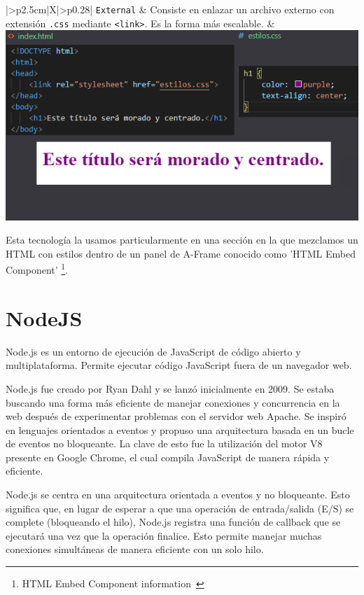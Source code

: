 \documentclass[a4paper, 12pt]{book}
\let\cleardoublepage\clearpage
\begin{document}
\begin{table}[H]
\begin{tabularx}{\linewidth}{|>{\centering\arraybackslash}p{2.5cm}|X|>{\centering\arraybackslash}p{0.28\linewidth}|}
      \texttt{External} &
      Consiste en enlazar un archivo externo con extensión \texttt{.css} mediante \texttt{<link>}. Es la forma más escalable. &
      \includegraphics[width=0.9\linewidth]{img/Style3.png} \\
      \hline
      \end{tabularx}
      \caption{Formas de aplicar CSS en un documento HTML}
      \label{tab:formas-css}
      \end{table}
  Esta tecnología la usamos particularmente en una sección en la que mezclamos un HTML con estilos dentro de un panel de A-Frame conocido como 'HTML Embed Component' \footnote{HTML Embed Component information~\cite{aframeComponent}}.

\cleardoublepage

\section{NodeJS} 
\label{sec:seccion9}

Node.js es un entorno de ejecución de JavaScript de código abierto y multiplataforma. Permite ejecutar código JavaScript fuera de un navegador web.

Node.js fue creado por Ryan Dahl y se lanzó inicialmente en 2009. Se estaba buscando una forma más eficiente de manejar conexiones y concurrencia en la web después de experimentar problemas con el servidor web Apache. Se inspiró en lenguajes orientados a eventos y propuso una arquitectura basada en un bucle de eventos no bloqueante. La clave de esto fue la utilización del motor V8 presente en Google Chrome, el cual compila JavaScript de manera rápida y eficiente.

Node.js se centra en una arquitectura orientada a eventos y no bloqueante. Esto significa que, en lugar de esperar a que una operación de entrada/salida (E/S) se complete (bloqueando el hilo), Node.js registra una función de callback que se ejecutará una vez que la operación finalice. Esto permite manejar muchas conexiones simultáneas de manera eficiente con un solo hilo. 
\end{document}
